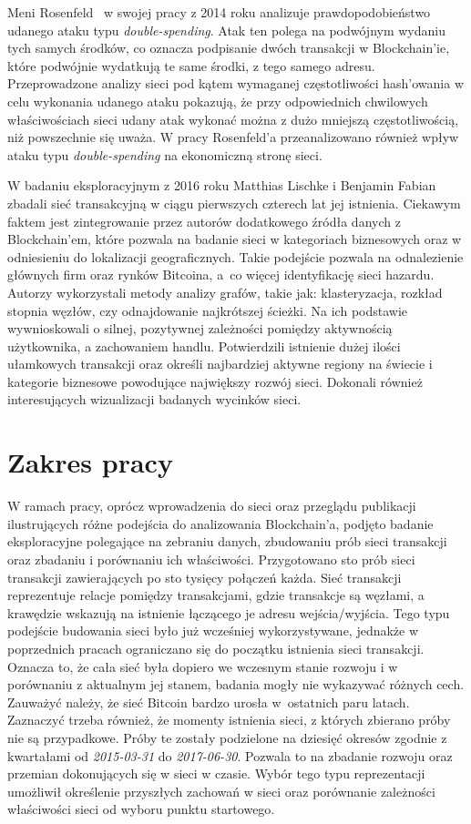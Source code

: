 \documentclass[12pt, oneside, final, openany]{mgr}
\begin{document}
\indent Meni Rosenfeld~\cite{Rosenfeld2014} w swojej pracy z 2014 roku analizuje prawdopodobieństwo udanego ataku typu \textit{double-spending}. Atak ten polega na podwójnym wydaniu tych samych środków, co oznacza podpisanie dwóch transakcji w Blockchain'ie, które podwójnie wydatkują te same środki, z tego samego adresu. Przeprowadzone analizy sieci pod kątem wymaganej częstotliwości hash'owania w celu wykonania udanego ataku pokazują, że przy odpowiednich chwilowych właściwościach sieci udany atak wykonać można z dużo mniejszą częstotliwością, niż powszechnie się uważa. W pracy  Rosenfeld'a przeanalizowano również wpływ ataku typu \textit{double-spending} na ekonomiczną stronę sieci.

\indent W badaniu eksploracyjnym z 2016 roku Matthias Lischke i Benjamin Fabian~\cite{Lischke2016} zbadali sieć transakcyjną w ciągu pierwszych czterech lat jej istnienia. Ciekawym faktem jest zintegrowanie przez autorów dodatkowego źródła danych z Blockchain'em, które pozwala na badanie sieci w kategoriach biznesowych oraz w odniesieniu do lokalizacji geograficznych. Takie podejście pozwala na odnalezienie głównych firm oraz rynków Bitcoina, a~co więcej identyfikację sieci hazardu. Autorzy wykorzystali metody analizy grafów, takie jak: klasteryzacja, rozkład stopnia węzłów, czy odnajdowanie najkrótszej ścieżki. Na ich podstawie wywnioskowali o silnej, pozytywnej zależności pomiędzy aktywnością użytkownika, a zachowaniem handlu. Potwierdzili istnienie dużej ilości ułamkowych transakcji oraz określi najbardziej aktywne regiony na świecie i kategorie biznesowe powodujące największy rozwój sieci. Dokonali również interesujących wizualizacji badanych wycinków sieci.
\if@archive\else{\newpage}\fi

\section{Zakres pracy}

\indent W ramach pracy, oprócz wprowadzenia do sieci oraz przeglądu publikacji ilustrujących różne podejścia do analizowania Blockchain'a, podjęto badanie eksploracyjne polegające na zebraniu danych, zbudowaniu prób sieci transakcji oraz zbadaniu i porównaniu ich właściwości. Przygotowano sto prób sieci transakcji zawierających po sto tysięcy połączeń każda. Sieć transakcji reprezentuje relacje pomiędzy transakcjami, gdzie transakcje są węzłami, a krawędzie wskazują na istnienie łączącego je adresu wejścia/wyjścia. Tego typu podejście budowania sieci było już wcześniej wykorzystywane, jednakże w poprzednich pracach ograniczano się do początku istnienia sieci transakcji. Oznacza to, że cała sieć była dopiero we wczesnym stanie rozwoju i w porównaniu z aktualnym jej stanem, badania mogły nie wykazywać różnych cech. Zauważyć należy, że sieć Bitcoin bardzo urosła w~ostatnich paru latach. Zaznaczyć trzeba również, że momenty istnienia sieci, z których zbierano próby nie są przypadkowe. Próby te zostały podzielone na dziesięć okresów zgodnie z kwartałami od \textit{2015-03-31} do \textit{2017-06-30}. Pozwala to na zbadanie rozwoju oraz przemian dokonujących się w sieci w czasie. Wybór tego typu reprezentacji umożliwił określenie przyszłych zachowań w sieci oraz porównanie zależności właściwości sieci od wyboru punktu startowego.
\end{document}
